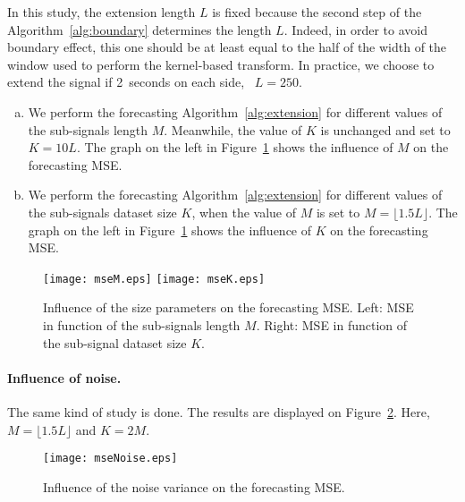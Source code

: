 In this study, the extension length $L$ is fixed because the second step of the Algorithm~\ref{alg:boundary} determines the length $L$. Indeed, in order to avoid boundary effect, this one should be at least equal to the half of the width of the window used to perform the kernel-based transform. In practice, we choose to extend the signal if 2~seconds on each side, \ie~$L=250$.
\begin{enumerate}[a),leftmargin=*]
\item 
We perform the forecasting Algorithm~\ref{alg:extension} for different values of the sub-signals length $M$. Meanwhile, the value of $K$ is unchanged and set to $K=10L$. The graph on the left in Figure~\ref{fig:influence.M} shows the influence of $M$ on the forecasting MSE. 
\item
We perform the forecasting Algorithm~\ref{alg:extension} for different values of the sub-signals dataset size $K$, when the value of $M$ is set to $M=\lfloor 1.5L\rfloor$. The graph on the left in Figure~\ref{fig:influence.M} shows the influence of $K$ on the forecasting MSE.
\end{enumerate} 

\begin{figure}
\texttt{[image: mseM.eps]}
\texttt{[image: mseK.eps]}
\caption{Influence of the size parameters on the forecasting MSE. Left: MSE in function of the sub-signals length $M$. Right: MSE in function of the sub-signal dataset size $K$.}
\label{fig:influence.M}
\end{figure}

\paragraph{Influence of noise.}
The same kind of study is done. The results are displayed on Figure~\ref{fig:influence.noise}. Here, $M=\lfloor 1.5L\rfloor$ and $K=2M$.

\begin{figure}
\centering
\texttt{[image: mseNoise.eps]}
\caption{Influence of the noise variance on the forecasting MSE.}
\label{fig:influence.noise}
\end{figure}

